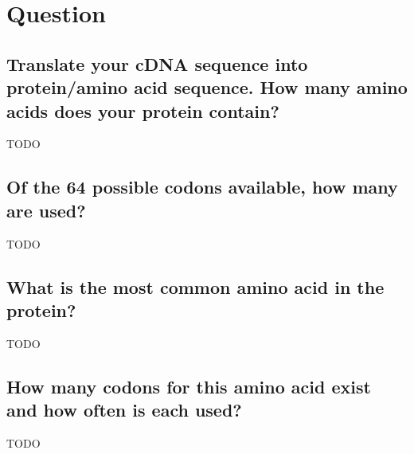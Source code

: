 \section{Question}

\subsection{Translate your cDNA sequence into protein/amino acid sequence. How many amino acids does your protein contain?  }

TODO

\medskip


\subsection{Of the 64 possible codons available, how many are used?}

TODO

\medskip


\subsection{What is the most common amino acid in the protein?}

TODO

\medskip


\subsection{How many codons for this amino acid exist and how often is each used?}

TODO

\newpage
